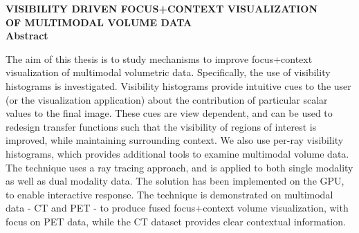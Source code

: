\begin{center}
\textbf{\Large VISIBILITY DRIVEN FOCUS+CONTEXT VISUALIZATION } \\
\vspace{0.5cm}
\textbf{\Large OF MULTIMODAL VOLUME DATA} \\
\vspace{2.0cm}
\textbf{\large Abstract}
\vspace{1.0cm}
\end{center}


The aim of this thesis is to study mechanisms to improve focus+context visualization of multimodal volumetric data. Specifically, the use of visibility histograms is investigated. Visibility histograms provide intuitive cues to the user (or the visualization application) about the contribution of particular scalar values to the final image.  These cues are view dependent, and can be used to redesign transfer functions such that the visibility of regions of interest is improved, while maintaining surrounding context. We also use per-ray visibility histograms, which provides additional tools to examine multimodal volume data. ​The technique uses a ray tracing approach, and is applied to both single modality as well as dual modality data. The solution has been implemented on the GPU, to enable interactive response. The technique is demonstrated on multimodal data -  CT and PET - to produce fused focus+context volume visualization, with focus on PET data, while the CT dataset provides clear contextual information. 


